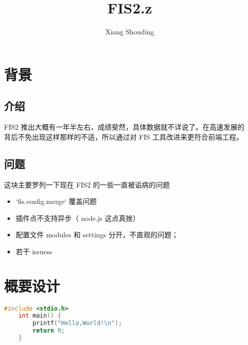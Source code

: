 \documentclass[11pt]{article}
\title{FIS2.z}
\author{Xiang Shouding}
\begin{document}
{\Code \maketitle}

\section{\Hei 背景}
    \subsection{\Hei 介绍}
        \Song
        {\Code FIS2 }推出大概有一年半左右，成绩斐然，具体数据就不详说了。在高速发展的\\
        背后不免出现这样那样的不适，所以通过对 {\Code FIS }工具改进来更符合前端工程。\\
        
    \subsection{\Hei 问题}
        这块主要罗列一下现在 {\Code FIS2 }的一些一直被诟病的问题\\
        \begin{itemize}
            \item {\Code `fis.config.merge` }覆盖问题
            \item 插件点不支持异步（{ \Code node.js }这点真挫）
            \item 配置文件{ \Code modules }和{ \Code settings }分开，不直观的问题；
            \item 若干{ \Code issuess }
        \end{itemize}
        
\section{\Hei 概要设计}

\Code
\begin{lstlisting}[language=c]
    #include <stdio.h>
    int main() {
        printf("Hello,World!\n");
        return 0;
    }
\end{lstlisting}


\Hei
\end{document}
